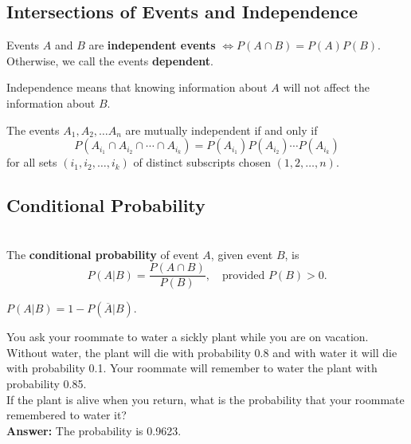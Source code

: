 \subsection{Intersections of Events and Independence}

\begin{definition}
    Events $A$ and $B$ are \textbf{independent events} $\iff P(A \cap B) = P(A)P(B).$
    Otherwise, we call the events \textbf{dependent}.
\end{definition}

Independence means that knowing information about $A$ will not affect the information about $B$.

\begin{definition}
    The events $A_1, A_2, \ldots A_n$ are mutually independent if and only if
    \[P(A_{i_1} \cap A_{i_2} \cap \cdots \cap A_{i_k}) = P(A_{i_1}) P(A_{i_2}) \cdots P(A_{i_k})\]
    for all sets $(i_1, i_2, \ldots, i_k)$ of distinct subscripts chosen $(1, 2, \ldots, n)$.
\end{definition}



\subsection{Conditional Probability}

\begin{definition}
    \phantom{}\\
    The \textbf{conditional probability} of event $A$, given event $B$, is
    \[P(A | B) = \frac{P(A \cap B)}{P(B)}, \quad \text{provided $P(B) > 0.$}\]
\end{definition}

\begin{note}
    $P(A|B) = 1 - P(\overline{A}|B)$.
\end{note}


\begin{example}
    You ask your roommate to water a sickly plant while you are on vacation. Without water, the plant will die with probability 0.8 and with water
    it will die with probability 0.1. Your roommate will remember to water the plant with probability 0.85. \\
    If the plant is alive when you return, what is the probability that your roommate remembered to water it? \\
    \textbf{Answer: } The probability is 0.9623. \\
\end{example}

